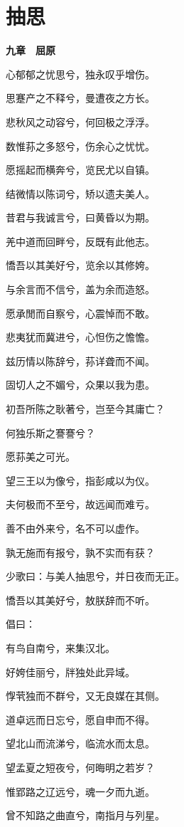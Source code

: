\documentclass[12pt,a4paper]{ctexbook}
\begin{document}
\section{抽思}
\textbf{九章　屈原}\par\vspace{0.5em}
心郁郁之忧思兮，独永叹乎增伤。\par
思蹇产之不释兮，曼遭夜之方长。\par
悲秋风之动容兮，何回极之浮浮。\par
数惟荪之多怒兮，伤余心之忧忧。\par
愿摇起而横奔兮，览民尤以自镇。\par
结微情以陈词兮，矫以遗夫美人。\par
昔君与我诚言兮，曰黄昏以为期。\par
羌中道而回畔兮，反既有此他志。\par
憍吾以其美好兮，览余以其修姱。\par
与余言而不信兮，盖为余而造怒。\par
愿承閒而自察兮，心震悼而不敢。\par
悲夷犹而冀进兮，心怛伤之憺憺。\par
兹历情以陈辞兮，荪详聋而不闻。\par
固切人之不媚兮，众果以我为患。\par
初吾所陈之耿著兮，岂至今其庸亡？\par
何独乐斯之謇謇兮？\par
愿荪美之可光。\par
望三王以为像兮，指彭咸以为仪。\par
夫何极而不至兮，故远闻而难亏。\par
善不由外来兮，名不可以虚作。\par
孰无施而有报兮，孰不实而有获？\par
少歌曰：与美人抽思兮，并日夜而无正。\par
憍吾以其美好兮，敖朕辞而不听。\par
倡曰：\par
有鸟自南兮，来集汉北。\par
好姱佳丽兮，牉独处此异域。\par
惸茕独而不群兮，又无良媒在其侧。\par
道卓远而日忘兮，愿自申而不得。\par
望北山而流涕兮，临流水而太息。\par
望孟夏之短夜兮，何晦明之若岁？\par
惟郢路之辽远兮，魂一夕而九逝。\par
曾不知路之曲直兮，南指月与列星。\par
\end{document}
